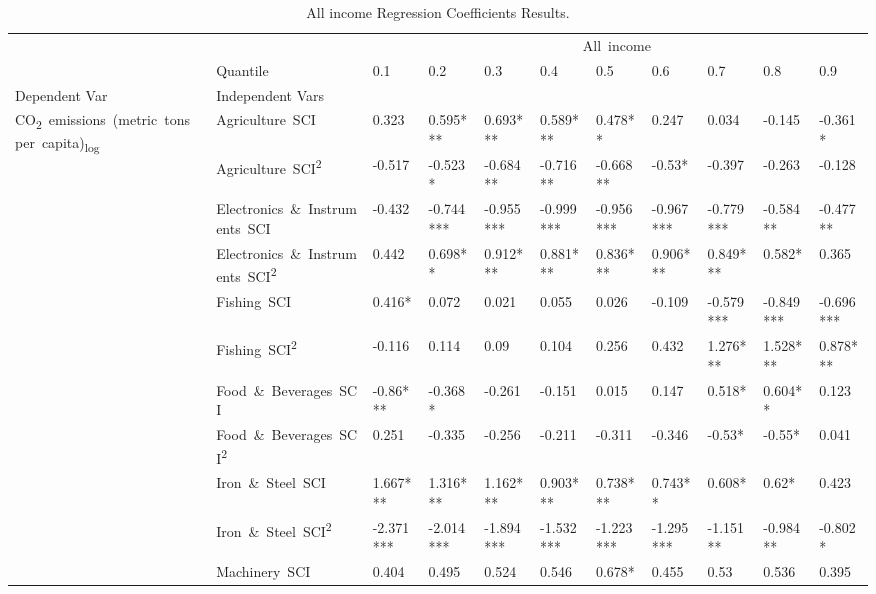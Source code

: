 \documentclass[10pt]{article}
\begin{document}
\begin{table}[ht]
	\centering
	\caption{All income Regression Coefficients Results.}
      \label{tab:all-income-coeffs}
\begin{adjustbox}{width=\textwidth,center}
      \begin{tabular}{lllllllllll}
      \toprule
       &  & \multicolumn{9}{c}{All\ income} \\
       & Quantile & 0.1 & 0.2 & 0.3 & 0.4 & 0.5 & 0.6 & 0.7 & 0.8 & 0.9 \\
      Dependent Var & Independent Vars &  &  &  &  &  &  &  &  &  \\
      \midrule
      \multirow[t]{31}{*}{CO\textsubscript{2}\ emissions\ (metric\ tons\ per\ capita)\textsubscript{log}} & Agriculture\ SCI & 0.323 & 0.595*** & 0.693*** & 0.589*** & 0.478** & 0.247 & 0.034 & -0.145 & -0.361* \\
      & Agriculture\ SCI\textsuperscript{2} & -0.517 & -0.523* & -0.684** & -0.716** & -0.668** & -0.53* & -0.397 & -0.263 & -0.128 \\
      & Electronics\ \&\ Instruments\ SCI & -0.432 & -0.744*** & -0.955*** & -0.999*** & -0.956*** & -0.967*** & -0.779*** & -0.584** & -0.477** \\
      & Electronics\ \&\ Instruments\ SCI\textsuperscript{2} & 0.442 & 0.698** & 0.912*** & 0.881*** & 0.836*** & 0.906*** & 0.849*** & 0.582* & 0.365 \\
      & Fishing\ SCI & 0.416* & 0.072 & 0.021 & 0.055 & 0.026 & -0.109 & -0.579*** & -0.849*** & -0.696*** \\
      & Fishing\ SCI\textsuperscript{2} & -0.116 & 0.114 & 0.09 & 0.104 & 0.256 & 0.432 & 1.276*** & 1.528*** & 0.878*** \\
      & Food\ \&\ Beverages\ SCI & -0.86*** & -0.368* & -0.261 & -0.151 & 0.015 & 0.147 & 0.518* & 0.604** & 0.123 \\
      & Food\ \&\ Beverages\ SCI\textsuperscript{2} & 0.251 & -0.335 & -0.256 & -0.211 & -0.311 & -0.346 & -0.53* & -0.55* & 0.041 \\
      & Iron\ \&\ Steel\ SCI & 1.667*** & 1.316*** & 1.162*** & 0.903*** & 0.738*** & 0.743** & 0.608* & 0.62* & 0.423 \\
      & Iron\ \&\ Steel\ SCI\textsuperscript{2} & -2.371*** & -2.014*** & -1.894*** & -1.532*** & -1.223*** & -1.295*** & -1.151** & -0.984** & -0.802* \\
      & Machinery\ SCI & 0.404 & 0.495 & 0.524 & 0.546 & 0.678* & 0.455 & 0.53 & 0.536 & 0.395 \\

\end{tabular}
\end{adjustbox}
\end{table}
\end{document}
